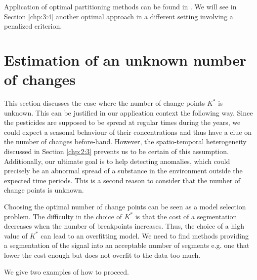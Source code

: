 Application of optimal partitioning methods can be found in \cite{rigaill2015pruned,Lavielle1997,perron2006dealing}. We will see in Section \ref{chp:3:4} another optimal approach in a different setting involving a penalized criterion.     


\section{Estimation of an unknown number of changes}\label{chp:3:3}

This section discusses the case where the number of change points $K^*$ is unknown. This can be justified in our application context the following way. Since the pesticides are supposed to be spread at regular times during the years, we could expect a seasonal behaviour of their concentrations and thus have a clue on the number of changes before-hand. However, the spatio-temporal heterogeneity discussed in Section \ref{chp:2:3} prevents us to be certain of this assumption. Additionally, our ultimate goal is to help detecting anomalies, which could precisely be an abnormal spread of a substance in the environment outside the expected time periods. This is a second reason to consider that the number of change points is unknown.

Choosing the optimal number of change points can be seen as a model selection problem. The difficulty in the choice of $K^*$ is that the cost of a segmentation decreases when the number of breakpoints increases. Thus, the choice of a high value of $K^*$ can lead to an overfitting model. We need to find methods providing a segmentation of the signal into an acceptable number of segments e.g. one that lower the cost enough but does not overfit to the data too much. 

We give two examples of how to proceed.

